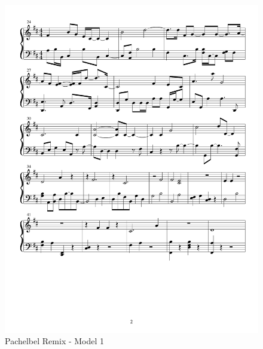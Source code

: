 \documentclass{article} %
\begin{document}
\begin{figure}[H]
\centering
\caption{Pachelbel Remix - Model 1}
\includegraphics [scale = 0.6] {PachelbelRemix-cropped.pdf}
\end{figure}
\end{document}
